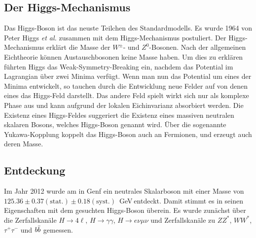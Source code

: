 \subsection{Der Higgs-Mechanismus}
Das Higgs-Boson ist das neuste Teilchen des Standardmodells. Es wurde 1964 von Peter Higgs \emph{et al.} zusammen mit dem Higgs-Mechanismus postuliert. Der Higgs-Mechanismus erklärt die Masse der $W^\pm$- und $Z^0$-Bosonen. Nach der allgemeinen Eichtheorie können Austauschbosonen keine Masse haben. Um dies zu erklären führten Higgs \etal das Weak-Symmetry-Breaking ein, nachdem das Potential im Lagrangian über zwei Minima verfügt. Wenn man nun das Potential um eines der Minima entwickelt, so tauchen durch die Entwicklung neue Felder auf von denen eines das Higgs-Feld darstellt. Das andere Feld spielt wirkt sich nur als komplexe Phase aus und kann aufgrund der lokalen Eichinvarianz absorbiert werden. Die Existenz eines Higgs-Feldes suggeriert die Existenz eines massiven neutralen skalaren Bosons, welches Higgs-Boson genannt wird.
Über die sogenannte Yukawa-Kopplung koppelt das Higgs-Boson auch an Fermionen, und erzeugt auch deren Masse.
\subsection{Entdeckung}
Im Jahr 2012 wurde am \lhc in Genf ein neutrales Skalarboson mit einer Masse von $125.36 \pm 0.37(\text{stat.}) \pm 0.18 (\text{syst.})$~GeV entdeckt. Damit stimmt es in seinen Eigenschaften mit dem gesuchten Higgs-Boson überein. Es wurde zunächst über die Zerfallskanäle $H \rightarrow 4 \ell$, $H \rightarrow \gamma\gamma$, $H \rightarrow e\nu\mu\nu$ und Zerfallskanäle zu $ZZ^*$, $WW^*$, $\tau^+\tau^-$ und $\mbox{$b\bar{b}$}$ gemessen.

